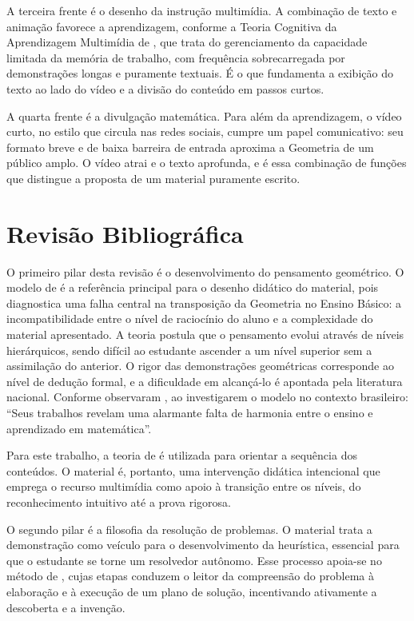 A terceira frente é o desenho da instrução multimídia. A combinação de texto e animação favorece a aprendizagem, conforme a Teoria Cognitiva da Aprendizagem Multimídia de , que trata do gerenciamento da capacidade limitada da memória de trabalho, com frequência sobrecarregada por demonstrações longas e puramente textuais. É o que fundamenta a exibição do texto ao lado do vídeo e a divisão do conteúdo em passos curtos.

A quarta frente é a divulgação matemática. Para além da aprendizagem, o vídeo curto, no estilo que circula nas redes sociais, cumpre um papel comunicativo: seu formato breve e de baixa barreira de entrada aproxima a Geometria de um público amplo. O vídeo atrai e o texto aprofunda, e é essa combinação de funções que distingue a proposta de um material puramente escrito.


\section{Revisão Bibliográfica}
O primeiro pilar desta revisão é o desenvolvimento do pensamento geométrico. O modelo de  é a referência principal para o desenho didático do material, pois diagnostica uma falha central na transposição da Geometria no Ensino Básico: a incompatibilidade entre o nível de raciocínio do aluno e a complexidade do material apresentado. A teoria postula que o pensamento evolui através de níveis hierárquicos, sendo difícil ao estudante ascender a um nível superior sem a assimilação do anterior. O rigor das demonstrações geométricas corresponde ao nível de dedução formal, e a dificuldade em alcançá-lo é apontada pela literatura nacional. Conforme observaram , ao investigarem o modelo no contexto brasileiro: ``Seus trabalhos revelam uma alarmante falta de harmonia entre o ensino e aprendizado em matemática''.

Para este trabalho, a teoria de  é utilizada para orientar a sequência dos conteúdos. O material é, portanto, uma intervenção didática intencional que emprega o recurso multimídia como apoio à transição entre os níveis, do reconhecimento intuitivo até a prova rigorosa.

O segundo pilar é a filosofia da resolução de problemas. O material trata a demonstração como veículo para o desenvolvimento da heurística, essencial para que o estudante se torne um resolvedor autônomo. Esse processo apoia-se no método de , cujas etapas conduzem o leitor da compreensão do problema à elaboração e à execução de um plano de solução, incentivando ativamente a descoberta e a invenção.

